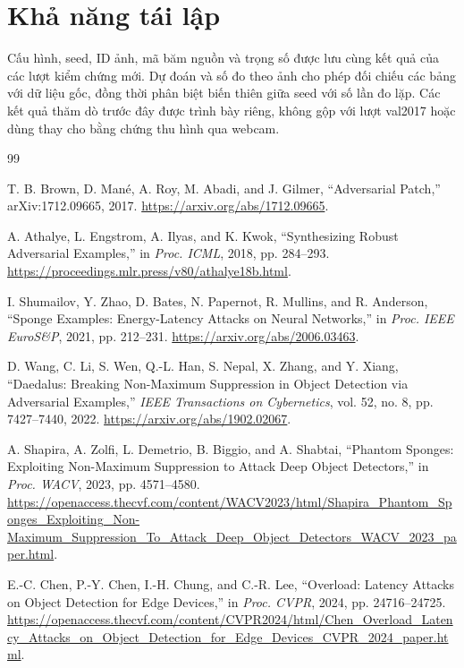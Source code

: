 \documentclass[a4paper,fleqn]{cas-dc}
\begin{document}
\section*{Khả năng tái lập}

Cấu hình, seed, ID ảnh, mã băm nguồn và trọng số được lưu cùng kết quả của các lượt kiểm chứng mới. Dự đoán và số đo theo ảnh cho phép đối chiếu các bảng với dữ liệu gốc, đồng thời phân biệt biến thiên giữa seed với số lần đo lặp. Các kết quả thăm dò trước đây được trình bày riêng, không gộp với lượt val2017 hoặc dùng thay cho bằng chứng thu hình qua webcam.

\begin{thebibliography}{99}

T. B. Brown, D. Mané, A. Roy, M. Abadi, and J. Gilmer,
``Adversarial Patch,'' arXiv:1712.09665, 2017. \url{https://arxiv.org/abs/1712.09665}.

A. Athalye, L. Engstrom, A. Ilyas, and K. Kwok,
``Synthesizing Robust Adversarial Examples,'' in \emph{Proc. ICML}, 2018, pp. 284--293. \url{https://proceedings.mlr.press/v80/athalye18b.html}.

I. Shumailov, Y. Zhao, D. Bates, N. Papernot, R. Mullins, and R. Anderson,
``Sponge Examples: Energy-Latency Attacks on Neural Networks,'' in \emph{Proc. IEEE EuroS\&P}, 2021, pp. 212--231. \url{https://arxiv.org/abs/2006.03463}.

D. Wang, C. Li, S. Wen, Q.-L. Han, S. Nepal, X. Zhang, and Y. Xiang,
``Daedalus: Breaking Non-Maximum Suppression in Object Detection via Adversarial Examples,'' \emph{IEEE Transactions on Cybernetics}, vol. 52, no. 8, pp. 7427--7440, 2022. \url{https://arxiv.org/abs/1902.02067}.

A. Shapira, A. Zolfi, L. Demetrio, B. Biggio, and A. Shabtai,
``Phantom Sponges: Exploiting Non-Maximum Suppression to Attack Deep Object Detectors,'' in \emph{Proc. WACV}, 2023, pp. 4571--4580. \url{https://openaccess.thecvf.com/content/WACV2023/html/Shapira_Phantom_Sponges_Exploiting_Non-Maximum_Suppression_To_Attack_Deep_Object_Detectors_WACV_2023_paper.html}.

E.-C. Chen, P.-Y. Chen, I.-H. Chung, and C.-R. Lee,
``Overload: Latency Attacks on Object Detection for Edge Devices,'' in \emph{Proc. CVPR}, 2024, pp. 24716--24725. \url{https://openaccess.thecvf.com/content/CVPR2024/html/Chen_Overload_Latency_Attacks_on_Object_Detection_for_Edge_Devices_CVPR_2024_paper.html}.


\end{thebibliography}
\end{document}
